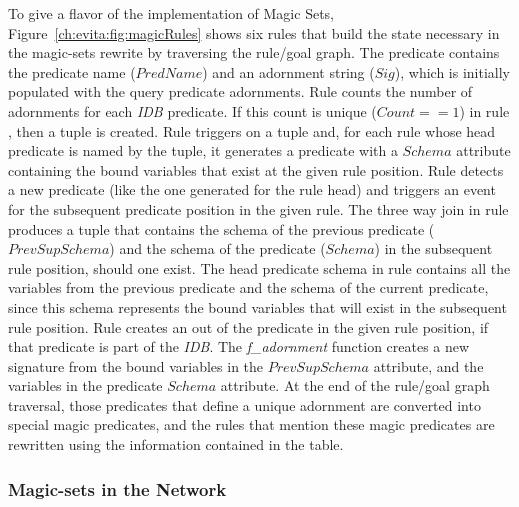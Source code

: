{To give a flavor of the \OVERLOG implementation of Magic Sets,
Figure~\ref{ch:evita:fig:magicRules} shows six rules that build the state
necessary in the magic-sets rewrite by traversing the rule/goal graph.  The
 predicate contains the predicate name ($PredName$) and an
adornment string ($Sig$), which is initially populated with the query predicate
adornments.  Rule  counts the number of adornments for each {\em IDB}
predicate.  If this count is unique ($Count == 1$) in rule , then a
 tuple is created.  Rule  triggers on a 
tuple and, for each rule whose head predicate is named by the 
tuple, it generates a  predicate with a $Schema$ attribute containing
the bound variables that exist at the given rule position.  Rule 
detects a new  predicate (like the one generated for the rule head) and
triggers an event for the subsequent  predicate position in the given
rule.  The three way join in rule  produces a tuple that contains the
schema of the previous  predicate ($PrevSupSchema$) and the schema of
the predicate ($Schema$) in the subsequent rule position, should one exist.
The head  predicate schema in rule  contains all the variables
from the previous  predicate and the schema of the current predicate,
since this schema represents the bound variables that will exist in the
subsequent rule position.  Rule  creates an  out of the
predicate in the given rule position, if that predicate is part of the {\em
IDB}.  The {\em f\_adornment} function creates a new signature from the bound
variables in the $PrevSupSchema$ attribute, and the variables in the predicate
$Schema$ attribute.  At the end of the rule/goal graph traversal, those
predicates that define a unique adornment are converted into special magic
predicates, and the rules that mention these magic predicates are rewritten
using the information contained in the  table.

\subsubsection{Magic-sets in the Network}

}
